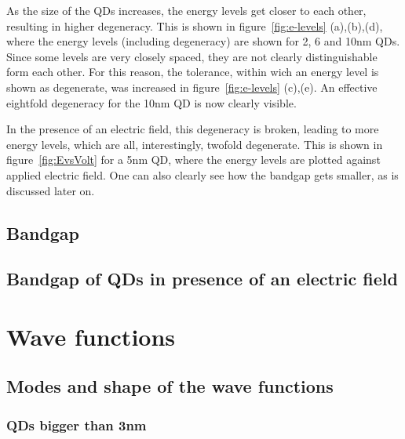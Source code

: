 As the size of the QDs increases, the energy levels get closer to each other, resulting in higher degeneracy. This is shown in figure~\ref{fig:e-levels} (a),(b),(d), where the energy levels (including degeneracy) are shown for 2, 6 and 10nm QDs. Since some levels are very closely spaced, they are not clearly distinguishable form each other. For this reason, the tolerance, within wich an energy level is shown as degenerate, was increased in figure~\ref{fig:e-levels} (c),(e). An effective eightfold degeneracy for the 10nm QD is now clearly visible.
	
In the presence of an electric field, this degeneracy is broken, leading to more energy levels, which are all, interestingly, twofold degenerate. This is shown in figure~\ref{fig:EvsVolt} for a 5nm QD, where the energy levels are plotted against applied electric field. One can also clearly see how the bandgap gets smaller, as is discussed later on.
\FloatBarrier
\subsection{Bandgap} 

\subsection{Bandgap of QDs in presence of an electric field}

\section{Wave functions}

\subsection{Modes and shape of the wave functions}

\subsubsection{QDs bigger than 3nm} 

